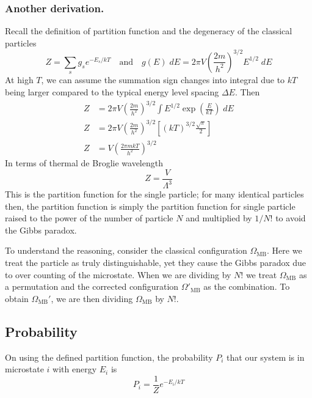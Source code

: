 \documentclass[../../../Main.tex]{subfiles}
\begin{document}
\subsubsection{Another derivation.} Recall the definition of partition function and the degeneracy of the classical particles
\begin{equation*}
	Z=\sum_{s} g_se^{-E_s/kT}\quad\text{and}\quad g(E)\;dE=2\pi V\left(\frac{2m}{h^2}\right)^{3/2}E^{1/2}\;dE
\end{equation*}
At high $T$, we can assume the summation sign changes into integral due to $kT$ being larger compared to the typical energy level spacing $\Delta E$.
Then
\begin{align*}
	Z & =2\pi V\left(\frac{2m}{h^2}\right)^{3/2}\int E^{1/2}\exp \left(\frac{E}{kT}\right)\;dE \\
	Z & =2\pi V\left(\frac{2m}{h^2}\right)^{3/2}\left[(kT)^{3/2}\frac{\sqrt{\pi}}{2}\right]    \\
	Z & =V\left(\frac{2\pi mkT}{h^2}\right)^{3/2}
\end{align*}
In terms of thermal de Broglie wavelength
\begin{equation*}
	Z=\frac{V}{\Lambda^3}
\end{equation*}
This is the partition function for the single particle; for many identical particles then, the partition function is simply the partition function for single particle raised to the power of the number of particle $N$ and multiplied by $1/N!$ to avoid the Gibbs paradox.

To understand the reasoning, consider the classical configuration $\Omega_\text{MB}$.
Here we treat the particle as truly distinguishable, yet they cause the Gibbs paradox due to over counting of the microstate.
When we are dividing by $N!$ we treat $\Omega_\text{MB}$ as a permutation and the corrected configuration $\Omega'_\text{MB}$ as the combination.
To obtain $\Omega_\text{MB}'$, we are then dividing $\Omega_\text{MB}$ by $N!$.

\subsection{Probability}
On using the defined partition function, the probability $P_i$ that our system is in microstate $i$ with energy $E_i$ is
\begin{equation*}
	P_i=\frac{1}{Z}e^{-E_i/kT}
\end{equation*}
\end{document}
